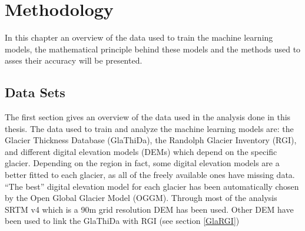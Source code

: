 \chapter{Methodology}\label{chap2}
\thispagestyle{plain}
In this chapter an overview of the data used to train the machine learning models, the mathematical principle behind these models and the methods used to asses their accuracy will be presented. 





\section{Data Sets}\label{glathida}
The first section gives an overview of the data used in the analysis done in this thesis. The data used to train and analyze the machine learning models are: the Glacier Thickness Database (GlaThiDa), the Randolph Glacier Inventory (RGI), and different digital elevation models (DEMs) which depend on the specific glacier. Depending on the region in fact, some digital elevation models are a better fitted to each glacier, as all of the freely available ones have missing data. ``The best'' digital elevation model for each glacier has been automatically chosen by the Open Global Glacier Model (OGGM). Through most of the analysis SRTM v4 \citep{SRTM} which is a 90m grid resolution DEM has been used. Other DEM have been used to link the GlaThiDa with RGI (see section \ref{GlaRGI})

